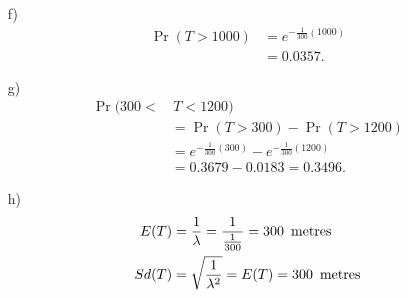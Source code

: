 \documentclass[12pt]{article}
\begin{document}
{\begin{minipage}[t]{0.98\textwidth}
\begin{minipage}[t]{0.47\textwidth}
\begin{enumerate}
\begin{align*}
\Pr(T < 100) &= 1 - \Pr(T > 100) \\
&= 1 - e^{-\frac{1}{300}(100)} \\
&= 1 - 0.7165 = 0.2835.
\end{align*}
\item[f)] \quad \\[-1.45cm]
\begin{align*}
\Pr(T > 1000) &= e^{-\frac{1}{300}(1000)} \\
&= 0.0357.
\end{align*}
\item[g)] \quad \\[-1.45cm]
\begin{align*}
\Pr(300 < &\,T < 1200)\\ &= \Pr(T >300) - \Pr(T > 1200)\\
&=  e^{-\frac{1}{300}(300)} - e^{-\frac{1}{300}(1200)} \\
&= 0.3679 - 0.0183 = 0.3496.
\end{align*}
\item[h)] \quad \\[-1.45cm]
\begin{align*}
E(T) &= \frac{1}{\lambda} = \frac{1}{\frac{1}{300}} = 300 \text{ \,metres}\\
Sd(T) &= \sqrt{\frac{1}{\lambda^2}} = E(T) = 300 \text{ \,metres}
\end{align*}
\end{enumerate}
\end{minipage}
\end{minipage}}\vspace{0.03\textwidth}
\end{document}
